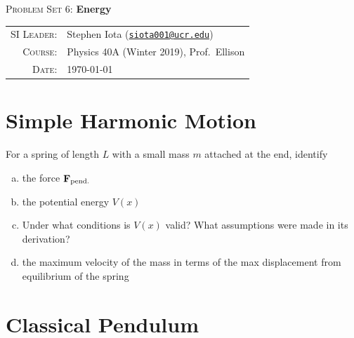 \documentclass[10pt]{article}
\newcommand{\email}[1]{\texttt{\href{mailto:#1}{#1}}}
\begin{document}
\begin{center}

\Large{\textsc{Problem Set 6}: \textbf{Energy}}
\end{center}
\vspace{.5mm}



\begin{tabular}{rl}
\textsc{SI Leader}:
&
Stephen Iota (\email{siota001@ucr.edu})
\\
\textsc{Course}:
&
Physics 40A (Winter 2019), Prof.~Ellison
\\
\textsc{Date}:
&
\today
\end{tabular}




\section{Simple Harmonic Motion}

For a spring of length $L$ with a small mass $m$ attached at the end, identify 
\begin{enumerate}[(a)]
	\item the force $\vb{F}_\text{pend.}$
	\vspace{-2mm}
	\item the potential energy $V(x)$
	\vspace{-2mm}
	\item Under what conditions is $V(x)$ valid? What assumptions were made in its derivation?
	\vspace{-2mm}
	\item the maximum velocity of the mass in terms of the max displacement from equilibrium of the spring
\end{enumerate}

\section{Classical Pendulum}
\end{document}
